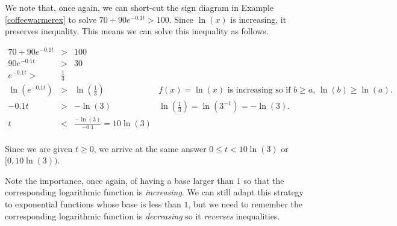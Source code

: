 \documentclass{ximera}
\begin{document}
We note that, once again, we can short-cut the sign diagram in Example \ref{coffeewarmerex} to solve $70 + 90 e^{-0.1 t} > 100$.  Since $\ln(x)$ is increasing, it preserves inequality.  This means we can solve this inequality as follows.

\[ \begin{array}{rclr}
70 + 90 e^{-0.1 t} & > & 100 & \\
90 e^{-0.1 t} & > & 30 & \\
e^{-0.1 t} > & \frac{1}{3} & \\
\ln \left( e^{-0.1 t} \right) & > & \ln \left( \frac{1}{3} \right) & \text{$f(x) = \ln(x)$ is increasing so if $b \geq a$, $\ln(b) \geq  \ln(a)$. } \\
-0.1 t & > & - \ln(3) & \text{$\ln \left( \frac{1}{3} \right) = \ln \left(3^{-1} \right) = - \ln(3)$.} \\
t & < & \frac{-\ln(3)}{-0.1} = 10 \ln(3) & \\ \end{array} \]

Since we are given $t \geq 0$, we arrive at the same answer $0 \leq t < 10\ln(3)$ or $[0, 10 \ln(3))$.  

Note the importance, once again, of having a base larger than $1$ so that the corresponding logarithmic function is \textit{increasing}.  We can still adapt this strategy to exponential functions whose base is less than $1$, but we need to remember the corresponding logarithmic function is \textit{decreasing} so it \textit{reverses}  inequalities.  
\end{document}
